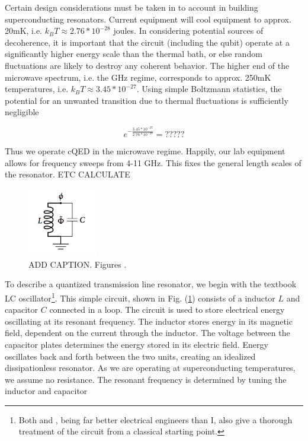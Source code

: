 \documentclass[12 pt]{book}
\begin{document}
Certain design considerations must be taken in to account in building superconducting resonators. Current equipment will cool equipment  to approx. 20mK, i.e. $k_BT\approx2.76*10^{-28}$ joules. In considering potential sources of decoherence, it is important that the circuit (including the qubit) operate at a significantly higher energy scale than the thermal bath, or else random fluctuations are likely to destroy any coherent behavior. The higher end of the microwave spectrum, i.e. the GHz regime, corresponds to approx. 250mK temperatures, i.e. $k_BT\approx3.45*10^{-27}$. Using simple Boltzmann statistics, the potential for an unwanted transition due to thermal fluctuations is sufficiently negligible

\begin{equation}
e^{-\frac{3.45*10^{-27}}{2.76*10^{-28}}}=?????
\end{equation}

Thus we operate cQED in the microwave regime. Happily, our lab equipment allows for frequency sweeps from 4-11 GHz. This fixes the general length scales of the resonator. ETC CALCULATE



\begin{figure}[h] 
   \centering
   \includegraphics[height=3cm]{BishopLC.png} 
   \caption{ADD CAPTION. Figures \cite{Bishop}.}
   \label{fig:LCOscillator}
\end{figure}

To describe a quantized transmission line resonator, we begin with the textbook LC oscillator\footnote{Both \cite{Bishop} and \cite{Schuster}, being far better electrical engineers than I, also give a thorough treatment of the circuit from a classical starting point.}. This simple circuit, shown in Fig. (\ref{fig:LCOscillator}) consists of a inductor $L$ and capacitor $C$ connected in a loop. The circuit is used to store electrical energy oscillating at its resonant frequency. The inductor stores energy in its magnetic field, dependent on the current through the inductor. The voltage between the capacitor plates determines the energy stored in its electric field. Energy oscillates back and forth between the two units, creating an idealized dissipationless resonator. As we are operating at superconducting temperatures, we assume no resistance. The resonant frequency is determined by tuning the inductor and capacitor
\end{document}
